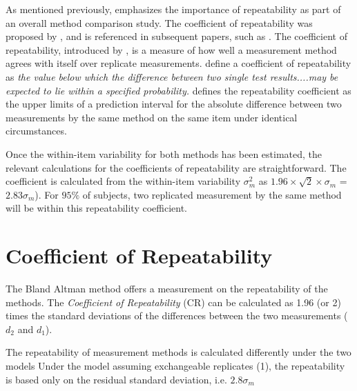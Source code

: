 \documentclass[12pt, a4paper]{report}
\theoremstyle{plain}
\theoremstyle{definition}
\theoremstyle{remark}
\begin{document}
	
	
	
As mentioned previously, \citet{Barnhart} emphasizes the importance of repeatability as part of an overall method comparison study. The coefficient of repeatability was proposed by \citet{BA99}, and is referenced in subsequent papers, such as \citet{BXC2008}. The coefficient of repeatability, introduced by \citet{BA99}, is a measure of how well a
measurement method agrees with itself over replicate measurements. \citet{BSIrepeat} define a coefficient of
repeatability  as \emph{the value below which the difference between two single test results....may be expected to lie within a specified probability.} \citet{BA99} defines the repeatability coefficient as the upper limits of a prediction interval for the absolute difference between two measurements by the same method on the same item under identical circumstances. %

 Once the within-item variability for both methods has been estimated, the relevant calculations for the coefficients of repeatability are straightforward.
The coefficient is calculated from the within-item variability $\sigma^2_{m}$ as  $1.96 \times \sqrt{2} \times \sigma_m$ = $2.83 \sigma_m$). For $95\%$ of subjects, two replicated measurement by the same method will be within this repeatability coefficient.
	
	




	
\section{Coefficient of Repeatability}
The Bland Altman method offers a measurement on the repeatability of the methods. The \emph{Coefficient of Repeatability} (CR) can be calculated as 1.96 (or 2) times the standard deviations of the differences between the two measurements ($d_2$ and $d_1$).		


%		
		
		The repeatability of measurement methods is calculated
		differently under the two models  Under the model assuming
		exchangeable replicates (1), the repeatability is based only on
		the residual standard deviation, i.e. $2.8\sigma_m$
	
\end{document}
